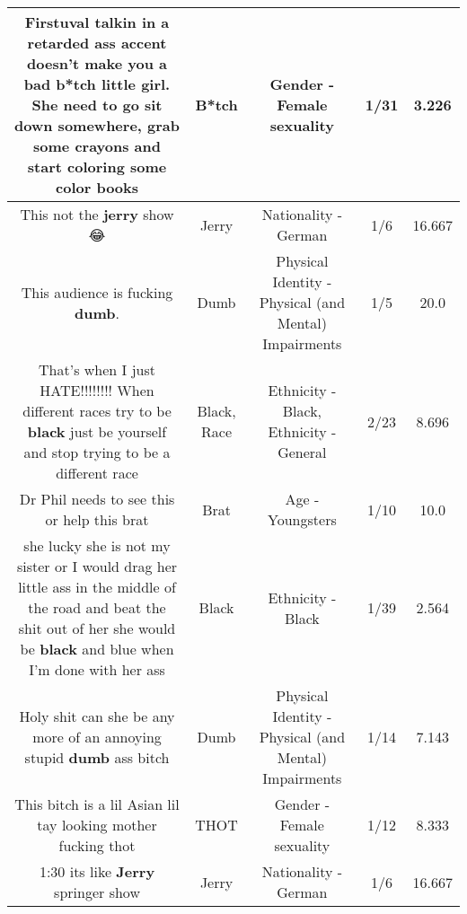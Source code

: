 \documentclass[11pt]{article}
\newlength\mylength
\begin{document}
\begin{center}
\begin{longtable}{|C{.65\mylength}|C{.30\mylength}|C{.12\mylength}|C{.12\mylength}|C{.12\mylength}|}
  \small Firstuval talkin in a retarded ass accent doesn't make you a bad \textbf{b*tch} little girl. She need to go sit down somewhere, grab some crayons and start coloring some color books\normalsize   & B*tch & Gender - Female sexuality & 1/31 & 3.226 \\  \hline
  \small This not the \textbf{jerry} show 😂\normalsize   & Jerry & Nationality - German & 1/6 & 16.667 \\  \hline
  \small This audience is fucking \textbf{dumb}.\normalsize   & Dumb & Physical Identity - Physical (and Mental) Impairments & 1/5 & 20.0 \\  \hline
  \small That's when I just HATE!!!!!!!! When different races try to be \textbf{black} just be yourself and stop trying to be a different race\normalsize   & Black, Race & Ethnicity - Black, Ethnicity - General & 2/23 & 8.696 \\  \hline
  \small Dr Phil needs to see this or help this brat\normalsize   & Brat & Age - Youngsters & 1/10 & 10.0 \\  \hline
  \small she lucky she is not my sister or I would drag her little ass in the middle of the road and beat the shit out of her she would be \textbf{black} and blue when I'm done with her ass\normalsize   & Black & Ethnicity - Black & 1/39 & 2.564 \\  \hline
  \small Holy shit can she be any more of an annoying stupid \textbf{dumb} ass bitch\normalsize   & Dumb & Physical Identity - Physical (and Mental) Impairments & 1/14 & 7.143 \\  \hline
  \small This bitch is a lil Asian lil tay looking mother fucking thot\normalsize   & THOT & Gender - Female sexuality & 1/12 & 8.333 \\  \hline
  \small 1:30 its like \textbf{Jerry} springer show\normalsize   & Jerry & Nationality - German & 1/6 & 16.667 \\  \hline

\end{longtable}
\end{center}
\end{document}
